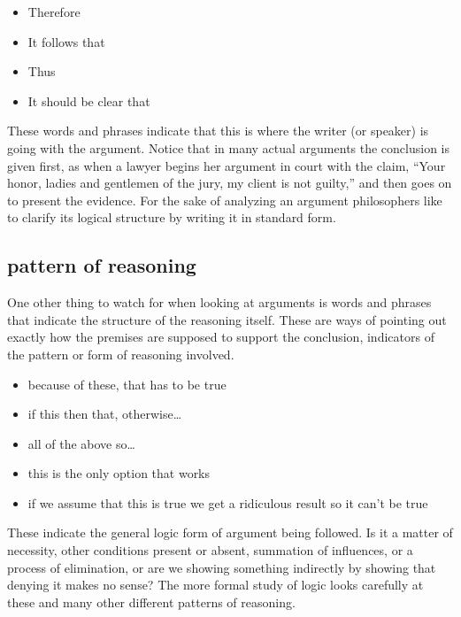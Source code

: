 \documentclass[justified]{tufte-book}
\providecommand{\tightlist}{%
  \setlength{\itemsep}{0pt}\setlength{\parskip}{0pt}}
\begin{document}
\begin{itemize}
\tightlist
\item
  Therefore
\item
  It follows that
\item
  Thus
\item
  It should be clear that
\end{itemize}

These words and phrases indicate that this is where the writer (or speaker) is going with the argument. Notice that in many actual arguments the conclusion is given first, as when a lawyer begins her argument in court with the claim, ``Your honor, ladies and gentlemen of the jury, my client is not guilty,'' and then goes on to present the evidence. For the sake of analyzing an argument philosophers like to clarify its logical structure by writing it in standard form.

\hypertarget{pattern-of-reasoning}{%
\subsection*{pattern of reasoning}\label{pattern-of-reasoning}}

One other thing to watch for when looking at arguments is words and phrases that indicate the structure of the reasoning itself. These are ways of pointing out exactly how the premises are supposed to support the conclusion, indicators of the pattern or form of reasoning involved.

\begin{itemize}
\tightlist
\item
  because of these, that has to be true
\item
  if this then that, otherwise\ldots{}
\item
  all of the above so\ldots{}
\item
  this is the only option that works
\item
  if we assume that this is true we get a ridiculous result so it can't be true
\end{itemize}

These indicate the general logic form of argument being followed. Is it a matter of necessity, other conditions present or absent, summation of influences, or a process of elimination, or are we showing something indirectly by showing that denying it makes no sense? The more formal study of logic looks carefully at these and many other different patterns of reasoning.
\end{document}
